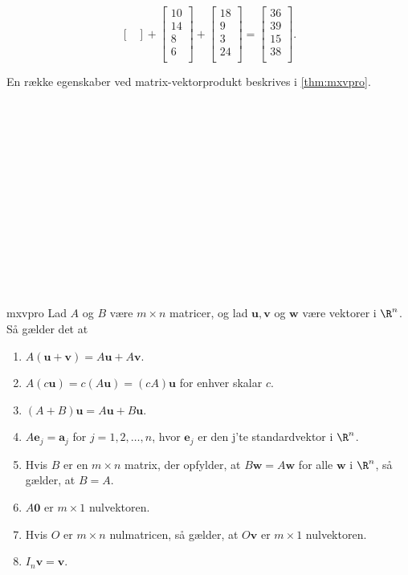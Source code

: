 \begin{eks}
$$\begin{bmatrix}
\end{bmatrix}
+
\begin{bmatrix}
10\\
14\\
8\\
6\\
\end{bmatrix}
+
\begin{bmatrix}
18\\
9\\
3\\
24\\
\end{bmatrix}
=
\begin{bmatrix}
36\\
39\\
15\\
38\\
\end{bmatrix}.
$$
\end{eks}
% 
En række egenskaber ved matrix-vektorprodukt beskrives i \ref{thm:mxvpro}.
\\\\
\phantom{  }
\\\\
\phantom{  }
\\\\
\phantom{  }
\\\\
\phantom{  }
\\\\
\phantom{  }
\\\\
\phantom{  }
\\\\
%
\begin{thm}{}{mxvpro}
Lad $A$ og $B$ være $m \times n$ matricer, og lad $\mathbf{u}, \mathbf{v}$ og $\mathbf{w}$ være vektorer i $\R^n$. Så gælder det at
\begin{enumerate}[label=(\alph*)]
\item $A(\mathbf{u}+\mathbf{v})=A\mathbf{u}+A\mathbf{v}$.
\item $A(c\mathbf{u})=c(A\mathbf{u})=(cA)\mathbf{u}$ for enhver skalar $c$.
\item $(A+B)\mathbf{u}=A\mathbf{u}+B\mathbf{u}$.
\item $A\mathbf{e}_j=\mathbf{a}_j$ for $j=1,2,\ldots,n$, hvor $\mathbf{e}_j$ er den j'te standardvektor i $\R^n$.
\item Hvis $B$ er en $m \times n$ matrix, der opfylder, at $B\mathbf{w}=A\mathbf{w}$ for alle $\mathbf{w}$ i $\R^n$, så gælder, at $B=A$.
\item $A\mathbf{0}$ er $m \times 1$ nulvektoren.
\item Hvis $O$ er $m \times n$ nulmatricen, så gælder, at $O\mathbf{v}$ er $m \times 1$ nulvektoren.
\item $I_n\mathbf{v}=\mathbf{v}$.
\end{enumerate}
\end{thm}
